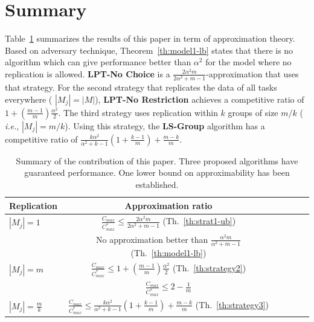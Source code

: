 \documentclass[10pt, conference, compsocconf]{IEEEtran}
\begin{document}
\section{Summary}\label{sec7}
Table~\ref{tab:template} summarizes the results of this paper in term
of approximation theory. Based on adversary technique,
Theorem~\ref{th:model1-lb} states that there is no algorithm which can
give performance better than $\alpha^2$ for the model where no
replication is allowed. {\bf LPT-No Choice} is a
$\frac{2\alpha^{2}m}{2\alpha^{2}+ m-1}$-approximation that uses that
strategy. For the second strategy that replicates the data of all
tasks everywhere ( $|M_j| = |M|$), {\bf LPT-No Restriction} achieves a
competitive ratio of $1 + (\frac{m-1}{m})\frac{\alpha^{2}}{2}$.  The
third strategy uses replication within $k$ groups of size $m/k$ ({\em
  i.e.}, $|M_j| = m/k$). Using this strategy, the {\bf LS-Group}
algorithm has a competitive ratio of
$\frac{k\alpha^{2}}{\alpha^{2}+k-1}\left( 1+ {\frac{k-1}{m}} \right) +
{\frac{m-k}{m}}$.



\begin{table}[ht]
  \centering
  \begin{tabular}{|l|c|c|c|c|c|}
    \hline
    Replication & Approximation ratio  \\
    \hline
    $|M_j|=1$ & $\frac{C_{max}}{C_{max}^{*}}\leq \frac{2\alpha^{2}m}{2\alpha^{2}+ m-1}$ (Th.~\ref{th:strat1-ub})  \\
    & No approximation better than $\frac{\alpha^{2}m }{\alpha^{2} + m-1}$ (Th.~\ref{th:model1-lb})   \\
    
    \hline
    $|M_j|=m$ & $\frac{C_{max}}{C_{max}^{*}} \leq 1 + (\frac{m-1}{m})\frac{\alpha^{2}}{2}$ (Th.~\ref{th:strategy2})  \\
    & $\frac{C_{max}}{C_{max}^{*}} \leq 2-\frac{1}{m}$ \cite{Graham66}   \\
    \hline
    
    $|M_j|= \frac{m}{k} $ & $\frac{C_{max}}{C_{max}^{*}} \leq \frac{k\alpha^{2}}{\alpha^{2}+k-1} \left(1+ {\frac{k-1}{m}} \right)+ {\frac{m-k}{m}}$ (Th.~\ref{th:strategy3})  \\
    
    \hline
  \end{tabular}
  \caption{Summary of the contribution of this paper.
    Three proposed algorithms have guaranteed performance.
    One lower bound on approximability has been established.}
  \label{tab:template}
\end{table}
\end{document}
